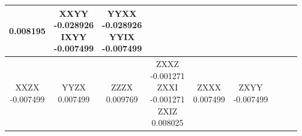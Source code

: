 \documentclass[twocolumn]{revtex4-1}
\newcommand{\1}{\mathbbm{1}}
\begin{document}
\begin{longtable}{|c|c|c|c|c|c|c|c|c|}
{0.008195\\ 
\vspace{.5\baselineskip}}
&
\parbox{1.9cm}{\centering\vspace{.5\baselineskip}
XXYY\\
-0.028926\\ 
IXYY\\
-0.007499\\ 
\vspace{.5\baselineskip}}
&
\parbox{1.9cm}{\centering\vspace{.5\baselineskip}
YYXX\\
-0.028926\\ 
YYIX\\
-0.007499\\ 
\vspace{.5\baselineskip}}\\
\hline
\parbox{1.9cm}{\centering\vspace{.5\baselineskip}
XXZX\\
-0.007499\\ 
\vspace{.5\baselineskip}}
&
\parbox{1.9cm}{\centering\vspace{.5\baselineskip}
YYZX\\
0.007499\\ 
\vspace{.5\baselineskip}}
&
\parbox{1.9cm}{\centering\vspace{.5\baselineskip}
ZZZX\\
0.009769\\ 
\vspace{.5\baselineskip}}
&
\parbox{1.9cm}{\centering\vspace{.5\baselineskip}
ZXXZ\\
-0.001271\\ 
ZXXI\\
-0.001271\\ 
ZXIZ\\
0.008025\\ 
\vspace{.5\baselineskip}}
&
\parbox{1.9cm}{\centering\vspace{.5\baselineskip}
ZXXX\\
0.007499\\ 
\vspace{.5\baselineskip}}
&
\parbox{1.9cm}{\centering\vspace{.5\baselineskip}
ZXYY\\
-0.007499\\ 
\vspace{.5\baselineskip}}

\end{longtable}
\end{document}
